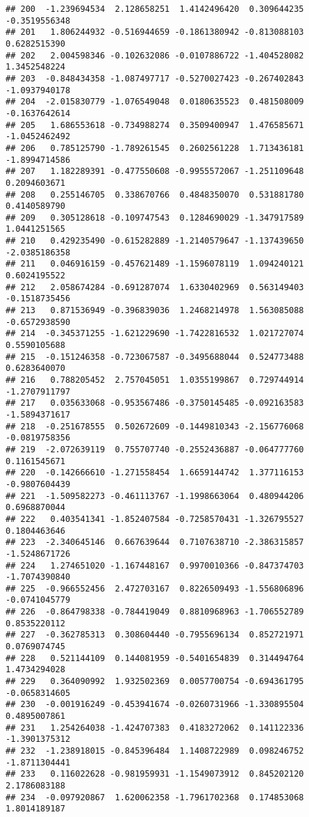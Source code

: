 \documentclass[
]{article}
\begin{document}
\begin{verbatim}
## 200  -1.239694534  2.128658251  1.4142496420  0.309644235 -0.3519556348
## 201   1.806244932 -0.516944659 -0.1861380942 -0.813088103  0.6282515390
## 202   2.004598346 -0.102632086 -0.0107886722 -1.404528082  1.3452548224
## 203  -0.848434358 -1.087497717 -0.5270027423 -0.267402843 -1.0937940178
## 204  -2.015830779 -1.076549048  0.0180635523  0.481508009 -0.1637642614
## 205   1.686553618 -0.734988274  0.3509400947  1.476585671 -1.0452462492
## 206   0.785125790 -1.789261545  0.2602561228  1.713436181 -1.8994714586
## 207   1.182289391 -0.477550608 -0.9955572067 -1.251109648  0.2094603671
## 208   0.255146705  0.338670766  0.4848350070  0.531881780  0.4140589790
## 209   0.305128618 -0.109747543  0.1284690029 -1.347917589  1.0441251565
## 210   0.429235490 -0.615282889 -1.2140579647 -1.137439650 -2.0385186358
## 211   0.046916159 -0.457621489 -1.1596078119  1.094240121  0.6024195522
## 212   2.058674284 -0.691287074  1.6330402969  0.563149403 -0.1518735456
## 213   0.871536949 -0.396839036  1.2468214978  1.563085088 -0.6572938590
## 214  -0.345371255 -1.621229690 -1.7422816532  1.021727074  0.5590105688
## 215  -0.151246358 -0.723067587 -0.3495688044  0.524773488  0.6283640070
## 216   0.788205452  2.757045051  1.0355199867  0.729744914 -1.2707911797
## 217   0.035633068 -0.953567486 -0.3750145485 -0.092163583 -1.5894371617
## 218  -0.251678555  0.502672609 -0.1449810343 -2.156776068 -0.0819758356
## 219  -2.072639119  0.755707740 -0.2552436887 -0.064777760  0.1161545671
## 220  -0.142666610 -1.271558454  1.6659144742  1.377116153 -0.9807604439
## 221  -1.509582273 -0.461113767 -1.1998663064  0.480944206  0.6968870044
## 222   0.403541341 -1.852407584 -0.7258570431 -1.326795527  0.1804463646
## 223  -2.340645146  0.667639644  0.7107638710 -2.386315857 -1.5248671726
## 224   1.274651020 -1.167448167  0.9970010366 -0.847374703 -1.7074390840
## 225  -0.966552456  2.472703167  0.8226509493 -1.556806896 -0.0741045779
## 226  -0.864798338 -0.784419049  0.8810968963 -1.706552789  0.8535220112
## 227  -0.362785313  0.308604440 -0.7955696134  0.852721971  0.0769074745
## 228   0.521144109  0.144081959 -0.5401654839  0.314494764  1.4734294028
## 229   0.364090992  1.932502369  0.0057700754 -0.694361795 -0.0658314605
## 230  -0.001916249 -0.453941674 -0.0260731966 -1.330895504  0.4895007861
## 231   1.254264038 -1.424707383  0.4183272062  0.141122336 -1.3901375312
## 232  -1.238918015 -0.845396484  1.1408722989  0.098246752 -1.8711304441
## 233   0.116022628 -0.981959931 -1.1549073912  0.845202120  2.1786083188
## 234  -0.097920867  1.620062358 -1.7961702368  0.174853068  1.8014189187

\end{verbatim}
\end{document}
